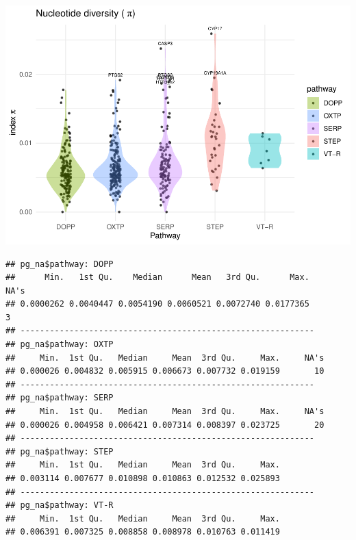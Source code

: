 \documentclass[
]{article}
\newenvironment{Shaded}{\begin{snugshade}}{\end{snugshade}}
\newcommand{\CommentTok}[1]{\textcolor[rgb]{0.56,0.35,0.01}{\textit{#1}}}
\newcommand{\FunctionTok}[1]{\textcolor[rgb]{0.00,0.00,0.00}{#1}}
\newcommand{\NormalTok}[1]{#1}
\newcommand{\SpecialCharTok}[1]{\textcolor[rgb]{0.00,0.00,0.00}{#1}}
\begin{document}
\includegraphics{RMD_file_files/figure-latex/unnamed-chunk-6-1.pdf}

\begin{Shaded}
\end{Shaded}

\begin{verbatim}
## pg_na$pathway: DOPP
##      Min.   1st Qu.    Median      Mean   3rd Qu.      Max.      NA's 
## 0.0000262 0.0040447 0.0054190 0.0060521 0.0072740 0.0177365         3 
## ------------------------------------------------------------ 
## pg_na$pathway: OXTP
##     Min.  1st Qu.   Median     Mean  3rd Qu.     Max.     NA's 
## 0.000026 0.004832 0.005915 0.006673 0.007732 0.019159       10 
## ------------------------------------------------------------ 
## pg_na$pathway: SERP
##     Min.  1st Qu.   Median     Mean  3rd Qu.     Max.     NA's 
## 0.000026 0.004958 0.006421 0.007314 0.008397 0.023725       20 
## ------------------------------------------------------------ 
## pg_na$pathway: STEP
##     Min.  1st Qu.   Median     Mean  3rd Qu.     Max. 
## 0.003114 0.007677 0.010898 0.010863 0.012532 0.025893 
## ------------------------------------------------------------ 
## pg_na$pathway: VT-R
##     Min.  1st Qu.   Median     Mean  3rd Qu.     Max. 
## 0.006391 0.007325 0.008858 0.008978 0.010763 0.011419
\end{verbatim}
\end{document}
